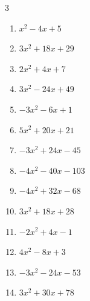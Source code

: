 \begin{multicols}{3}
\begin{enumerate}
  \item $x^{2}-4x+5$


  \item $3x^{2}+18x+29$


  \item $2x^{2}+4x+7$


  \item $3x^{2}-24x+49$


  \item $-3x^{2}-6x+1$


  \item $5x^{2}+20x+21$


\columnbreak %

  \item $-3x^{2}+24x-45$


  \item $-4x^{2}-40x-103$


  \item $-4x^{2}+32x-68$


  \item $3x^{2}+18x+28$


  \item $-2x^{2}+4x-1$


  \item $4x^{2}-8x+3$


  \item $-3x^{2}-24x-53$


  \item $3x^{2}+30x+78$


\end{enumerate}
\end{multicols}
